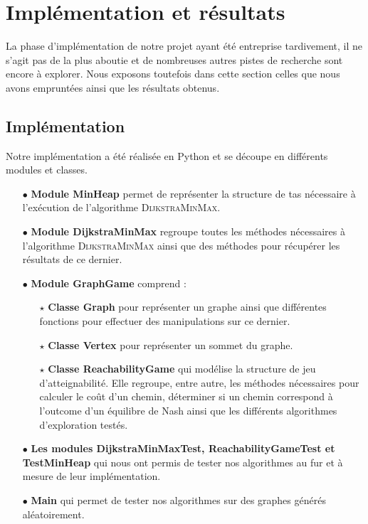 
\section{Implémentation et résultats}
\label{section:implementation}

La phase d'implémentation de notre projet ayant été entreprise tardivement, il ne s'agit pas de la plus aboutie et de nombreuses autres pistes de recherche sont encore à explorer. Nous exposons toutefois dans cette section celles que nous avons empruntées ainsi que les résultats obtenus.

\subsection{Implémentation} 
Notre implémentation a été réalisée en Python et se découpe en différents modules et classes.

\begin{itemize}
	
	\item[$\bullet$]\textbf{Module MinHeap} permet de représenter la structure de tas nécessaire à l'exécution de l'algorithme \textsc{DijkstraMinMax}. 
	\item[$\bullet$]\textbf{Module DijkstraMinMax} regroupe toutes les méthodes nécessaires à l'algorithme \textsc{DijkstraMinMax} ainsi que des méthodes pour récupérer les résultats de ce dernier.
	\item[$\bullet$]\textbf{Module GraphGame} comprend :
	\begin{itemize}
		\item[$\star$] \textbf{Classe Graph} pour représenter un graphe ainsi que différentes fonctions pour effectuer des manipulations sur ce dernier.
		\item[$\star$] \textbf{Classe Vertex} pour représenter un sommet du graphe.
		\item[$\star$] \textbf{Classe ReachabilityGame} qui modélise la structure de jeu d'atteignabilité. Elle regroupe, entre autre, les méthodes nécessaires pour calculer le coût d'un chemin, déterminer si un chemin correspond à l'outcome d'un équilibre de Nash ainsi que les différents algorithmes d'exploration testés.
	\end{itemize}
	
	\item[$\bullet$] \textbf{Les modules DijkstraMinMaxTest, ReachabilityGameTest et TestMinHeap} qui nous ont permis de tester nos algorithmes au fur et à mesure de leur implémentation.
	\item[$\bullet$] \textbf{Main} qui permet de tester nos algorithmes sur des graphes générés aléatoirement.
\end{itemize}

